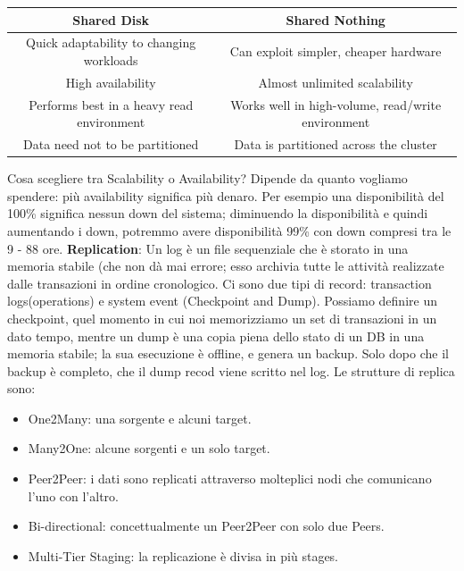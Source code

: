 \documentclass[a4page, 11pt]{article}
\begin{document}
\begin{center}
	\begin{tabular}{|c|c|}
		\hline
		\textbf{Shared Disk} & \textbf{Shared Nothing}\\
		\hline
		Quick adaptability to changing workloads & Can exploit simpler, cheaper hardware\\
		\hline
		High availability & Almost unlimited scalability\\
		\hline
		Performs best in a heavy read environment & Works well in high-volume, read/write environment\\
		\hline
		Data need not to be partitioned & Data is partitioned across the cluster\\
		\hline
	\end{tabular}
\end{center}
Cosa scegliere tra Scalability o Availability? Dipende da quanto vogliamo spendere: più availability significa più denaro. Per esempio una disponibilità del 100\% significa nessun down del sistema; diminuendo la disponibilità e quindi aumentando i down, potremmo avere disponibilità 99\% con down compresi tra le 9 - 88 ore.
\newline
\textbf{Replication}:
\newline
Un log è un file sequenziale che è storato in una memoria stabile (che non dà mai errore; esso archivia tutte le attività realizzate dalle
transazioni in ordine cronologico. Ci sono due tipi di record: transaction logs(operations) e system event (Checkpoint and Dump).
Possiamo definire un checkpoint, quel momento in cui noi memorizziamo un set di transazioni in un dato tempo, mentre un dump è una copia piena dello stato di un DB in una memoria stabile; la sua esecuzione è offline, e genera un backup. Solo dopo che il backup è completo, che il dump recod viene scritto nel log.
\newline
Le strutture di replica sono:
\begin{itemize}[noitemsep]
	\item One2Many: una sorgente e alcuni target.
	\item Many2One: alcune sorgenti e un solo target.
	\item Peer2Peer: i dati sono replicati attraverso molteplici nodi che comunicano l'uno con l'altro.
	\item Bi-directional: concettualmente un Peer2Peer con solo due Peers.
	\item Multi-Tier Staging: la replicazione è divisa in più stages.
\end{itemize}
\end{document}
